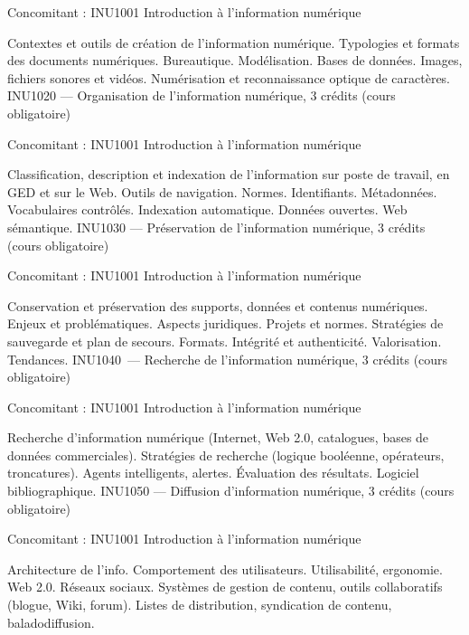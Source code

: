 \documentclass [12 pt]{article}
\begin{document}
                Concomitant : INU1001 Introduction à l'information numérique
            
            Contextes et outils de création de l'information numérique. Typologies et formats des
                documents numériques. Bureautique. Modélisation. Bases de données. Images, fichiers
                sonores et vidéos. Numérisation et reconnaissance optique de caractères.
            INU1020 — Organisation de l'information numérique, 3 crédits (cours
                obligatoire)
            
                Concomitant : INU1001 Introduction à l'information numérique
            
            Classification, description et indexation de l'information sur poste de travail, en
                GED et sur le Web. Outils de navigation. Normes. Identifiants. Métadonnées.
                Vocabulaires contrôlés. Indexation automatique. Données ouvertes. Web
                sémantique.
            INU1030 — Préservation de l'information numérique, 3 crédits (cours
                obligatoire)
            
                Concomitant : INU1001 Introduction à l'information numérique
            
            Conservation et préservation des supports, données et contenus numériques. Enjeux et
                problématiques. Aspects juridiques. Projets et normes. Stratégies de sauvegarde et
                plan de secours. Formats. Intégrité et authenticité. Valorisation. Tendances.
            INU1040 — Recherche de l'information numérique, 3 crédits (cours
                obligatoire)
            
                Concomitant : INU1001 Introduction à l'information numérique
            
            Recherche d'information numérique (Internet, Web 2.0, catalogues, bases de données
                commerciales). Stratégies de recherche (logique booléenne, opérateurs, troncatures).
                Agents intelligents, alertes. Évaluation des résultats. Logiciel
                bibliographique.
            INU1050 — Diffusion d'information numérique, 3 crédits (cours obligatoire)
            
                Concomitant : INU1001 Introduction à l'information numérique
            
            Architecture de l'info. Comportement des utilisateurs. Utilisabilité, ergonomie. Web
                2.0. Réseaux sociaux. Systèmes de gestion de contenu, outils collaboratifs (blogue,
                Wiki, forum). Listes de distribution, syndication de contenu, baladodiffusion.
            
\end{document}
